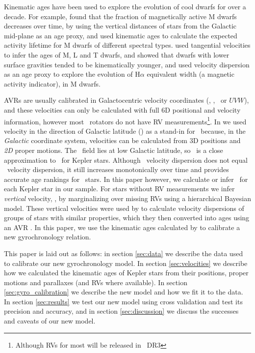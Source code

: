 Kinematic ages have been used to explore the evolution of cool dwarfs for over
a decade.
For example, \citet{west2004, west2006} found that the fraction of
magnetically active M dwarfs decreases over time, by using the vertical
distances of stars from the Galactic mid-plane as an age proxy, and
\citet{west2008} used kinematic ages to calculate the expected activity
lifetime for M dwarfs of different spectral types.
\citet{faherty2009} used tangential velocities to infer the ages of M, L and T
dwarfs, and showed that dwarfs with lower surface gravities tended to be
kinematically younger, and \citet{kiman2019} used velocity dispersion as an
age proxy to explore the evolution of H$\alpha$ equivalent width (a magnetic
activity indicator), in M dwarfs.

AVRs are usually calibrated in Galactocentric velocity coordinates (\vx, \vy,
\vz\ or $UVW$), and these velocities can only be calculated with full 6D
positional and velocity information, however most \kepler\ rotators do not
have RV measurements\footnote{Although RVs for most will be released in \gaia\
DR3}.
In \citep{angus2020} we used velocity in the direction of Galactic latitude
(\vb) as a stand-in for \vz\ because, in the {\it Galactic} coordinate system,
velocities can be calculated from 3D positions and {\it 2D} proper motions.
The \kepler\ field lies at low Galactic latitude, so \vb\ is a close
approximation to \vz\ for Kepler stars.
Although \vb\ velocity dispersion does not equal \vz\ velocity dispersion, it
still increases monotonically over time and provides accurate age rankings for
\kepler\ stars.
In this paper however, we calculate or infer \vz\ for each Kepler star in our
sample.
For stars without RV measurements we infer {\it vertical} velocity, \vz, by
marginalizing over missing RVs using a hierarchical Bayesian model.
These vertical velocities were used by \citet{lu2021} to calculate velocity
dispersions of groups of stars with similar properties, which they then
converted into ages using an AVR \citep{yu2018}.
In this paper, we use the kinematic ages calculated by \citet{lu2021} to
calibrate a new gyrochronology relation.

This paper is laid out as follows: in section \ref{sec:data} we describe the
data used to calibrate our new gyrochronology model.
In section \ref{sec:velocities} we describe how we calculated the kinematic
ages of Kepler stars from their positions, proper motions and parallaxes (and
RVs where available).
In section \ref{sec:gyro_calibration} we describe the new model and how we fit
it to the data.
In section \ref{sec:results} we test our new model using cross validation and
test its precision and accuracy, and in section \ref{sec:discussion} we
discuss the successes and caveats of our new model.
